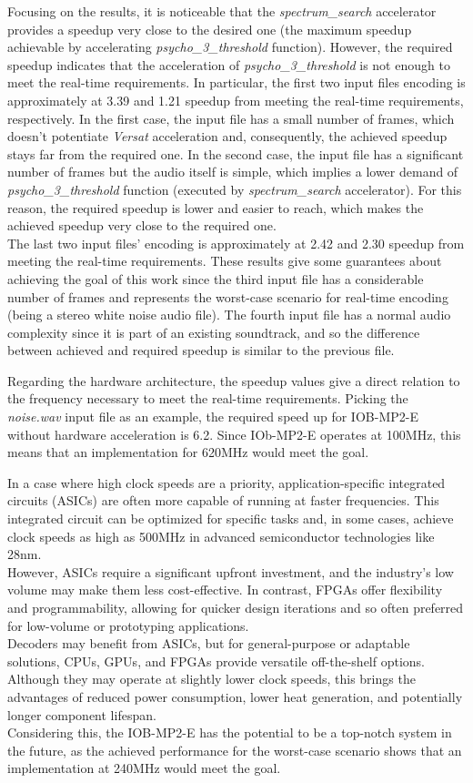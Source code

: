Focusing on the results, it is noticeable that the \textit{spectrum\_search} accelerator provides a speedup very close to the desired one (the maximum speedup achievable by accelerating \textit{psycho\_3\_threshold} function).
However, the required speedup indicates that the acceleration of \textit{psycho\_3\_threshold} is not enough to meet the real-time requirements. 
In particular, the first two input files encoding is approximately at 3.39 and 1.21 speedup from meeting the real-time requirements, respectively. In the first case, the input file has a small number of frames, which doesn't potentiate \textit{Versat} acceleration and, consequently, the achieved speedup stays far from the required one.
In the second case, the input file has a significant number of frames but the audio itself is simple, which implies a lower demand of \textit{psycho\_3\_threshold} function (executed by \textit{spectrum\_search} accelerator). For this reason, the required speedup is lower and easier to reach, which makes the achieved speedup very close to the required one. \\
The last two input files' encoding is approximately at 2.42 and 2.30 speedup from meeting the real-time requirements. These results give some guarantees about achieving the goal of this work since the third input file has a considerable number of frames and represents the worst-case scenario for real-time encoding (being a stereo white noise audio file). The fourth input file has a normal audio complexity since it is part of an existing soundtrack, and so the difference between achieved and required speedup is similar to the previous file.

Regarding the hardware architecture, the speedup values give a direct relation to the frequency necessary to meet the real-time requirements. Picking the \textit{noise.wav} input file as an example, the required speed up for IOB-MP2-E without hardware acceleration is 6.2. Since IOb-MP2-E operates at 100MHz, this means that an implementation for 620MHz would meet the goal. 

In a case where high clock speeds are a priority, application-specific integrated circuits (ASICs) are often more capable of running at faster frequencies. This integrated circuit can be optimized for specific tasks and, in some cases, achieve clock speeds as high as 500MHz in advanced semiconductor technologies like 28nm.\\
However, ASICs require a significant upfront investment, and the industry's low volume may make them less cost-effective. In contrast, FPGAs offer flexibility and programmability, allowing for quicker design iterations and so often preferred for low-volume or prototyping applications. \\
Decoders may benefit from ASICs, but for general-purpose or adaptable solutions, CPUs, GPUs, and FPGAs provide versatile off-the-shelf options. Although they may operate at slightly lower clock speeds, this brings the advantages of reduced power consumption, lower heat generation, and potentially longer component lifespan.\\
Considering this, the IOB-MP2-E has the potential to be a top-notch system in the future, as the achieved performance for the worst-case scenario shows that an implementation at 240MHz would meet the goal.
